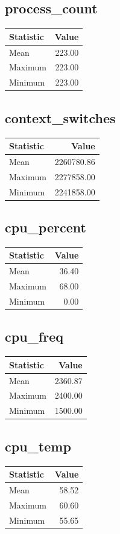 \documentclass[11pt]{article}
\begin{document}
\subsection{process_count}
\begin{tabular}{lr}
\toprule
Statistic & Value \\
\midrule
Mean & 223.00 \\
Maximum & 223.00 \\
Minimum & 223.00 \\
\bottomrule
\end{tabular}


\subsection{context_switches}
\begin{tabular}{lr}
\toprule
Statistic & Value \\
\midrule
Mean & 2260780.86 \\
Maximum & 2277858.00 \\
Minimum & 2241858.00 \\
\bottomrule
\end{tabular}


\subsection{cpu_percent}
\begin{tabular}{lr}
\toprule
Statistic & Value \\
\midrule
Mean & 36.40 \\
Maximum & 68.00 \\
Minimum & 0.00 \\
\bottomrule
\end{tabular}


\subsection{cpu_freq}
\begin{tabular}{lr}
\toprule
Statistic & Value \\
\midrule
Mean & 2360.87 \\
Maximum & 2400.00 \\
Minimum & 1500.00 \\
\bottomrule
\end{tabular}


\subsection{cpu_temp}
\begin{tabular}{lr}
\toprule
Statistic & Value \\
\midrule
Mean & 58.52 \\
Maximum & 60.60 \\
Minimum & 55.65 \\
\bottomrule
\end{tabular}
\end{document}
